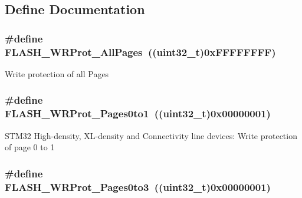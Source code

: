 \subsection{Define Documentation}
\hypertarget{group__Option__Bytes__Write__Protection_ga6fdaf38a559d606660dd10a411b77ea5}{
\subsubsection[{FLASH\_\-WRProt\_\-AllPages}]{\setlength{\rightskip}{0pt plus 5cm}\#define FLASH\_\-WRProt\_\-AllPages~((uint32\_\-t)0xFFFFFFFF)}}
\label{group__Option__Bytes__Write__Protection_ga6fdaf38a559d606660dd10a411b77ea5}
Write protection of all Pages \hypertarget{group__Option__Bytes__Write__Protection_ga7dfbb58b90b63afef11bfcf7a8f109e2}{
\subsubsection[{FLASH\_\-WRProt\_\-Pages0to1}]{\setlength{\rightskip}{0pt plus 5cm}\#define FLASH\_\-WRProt\_\-Pages0to1~((uint32\_\-t)0x00000001)}}
\label{group__Option__Bytes__Write__Protection_ga7dfbb58b90b63afef11bfcf7a8f109e2}
STM32 High-\/density, XL-\/density and Connectivity line devices: Write protection of page 0 to 1 \hypertarget{group__Option__Bytes__Write__Protection_gac5c6f6155e4ebae0978a3d2a0d991e68}{
\subsubsection[{FLASH\_\-WRProt\_\-Pages0to3}]{\setlength{\rightskip}{0pt plus 5cm}\#define FLASH\_\-WRProt\_\-Pages0to3~((uint32\_\-t)0x00000001)}}
\label{group__Option__Bytes__Write__Protection_gac5c6f6155e4ebae0978a3d2a0d991e68}
